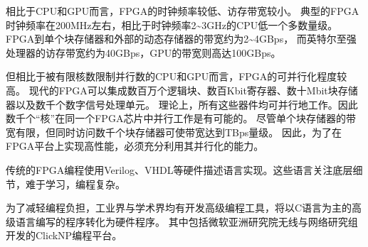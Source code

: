 相比于CPU和GPU而言，FPGA的时钟频率较低、访存带宽较小。
典型的FPGA时钟频率在200MHz左右，相比于时钟频率2\textasciitilde 3GHz的CPU低一个多数量级。
FPGA到单个块存储器和外部的动态存储器的带宽约为2\textasciitilde 4GBps，
而英特尔至强处理器的访存带宽约为40GBps，GPU的带宽则高达100GBps。

但相比于被有限核数限制并行数的CPU和GPU而言，FPGA的可并行化程度较高。
现代的FPGA可以集成数百万个逻辑块、数百Kbit寄存器、数十Mbit块存储器以及数千个数字信号处理单元。
理论上，所有这些器件均可并行地工作。因此数千个“核”在同一个FPGA芯片中并行工作是有可能的。
尽管单个块存储器的带宽有限，但同时访问数千个块存储器可使带宽达到TBps量级。
因此，为了在FPGA平台上实现高性能，必须充分利用其并行化的能力。

传统的FPGA编程使用Verilog、VHDL等硬件描述语言实现。这些语言关注底层细节，难于学习，编程复杂。

为了减轻编程负担，工业界与学术界均有开发高级编程工具，将以C语言为主的高级语言编写的程序转化为硬件程序。
其中包括微软亚洲研究院无线与网络研究组开发的ClickNP编程平台。
